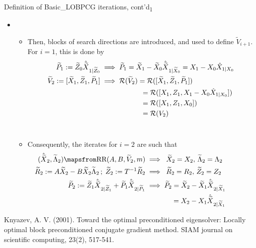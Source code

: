 \documentclass[t,usepdftitle=false]{beamer}
\begin{document}
\begin{frame}{Definition of Basic\_LOBPCG iterations, cont'd\textsubscript{1}}
	\begin{itemize}
	\item[]
	\begin{itemize}
	\item Then, blocks of search directions are introduced, and used to define $\widetilde{V}_{i+1}$.\\
	For $i=1$, this is done by\vspace{-.1cm}
	\begin{align*}
		\widetilde{P}_1:=\widetilde{Z}_0\hat{\widetilde{X}}_{1|\widetilde{Z}_0}
		&\implies\widetilde{P}_1=
		\widetilde{X}_1-\widetilde{X}_0\hat{\widetilde{X}}_{1|\widetilde{X}_0}=
		X_1-X_0\hat{X}_{1|X_0}\\
		\widetilde{V}_2:=[\widetilde{X}_1,\widetilde{Z}_1,\widetilde{P}_1]
		&\implies\mathcal{R}(\widetilde{V}_2)=\mathcal{R}([\widetilde{X}_1,\widetilde{Z}_1,\widetilde{P}_1])\\
		&\hspace{2.05cm}=\mathcal{R}([X_1,Z_1,X_1-X_0\hat{X}_{1|X_0}])\\
		&\hspace{2.05cm}=\mathcal{R}([X_1,Z_1,X_0])\\
		&\hspace{2.05cm}=\mathcal{R}(V_2)
	\end{align*}
	\vspace{-.6cm}\\
	\item Consequently, the iterates for $i=2$ are such that\vspace{-.1cm}
	\begin{align*}
	\hspace{-1.1cm}
	(\hat{\widetilde{X}}_2,\widetilde{\Lambda}_2)\mapsfrom\text{RR}(A,B,\widetilde{V}_{2},m)
	&\implies\;\widetilde{X}_2=X_2,\,\widetilde{\Lambda}_2=\Lambda_2\\
	\hspace{-1.1cm}
	\widetilde{R}_2:=A\widetilde{X}_2-B\widetilde{X}_2\widetilde{\Lambda}_2\,;\;\widetilde{Z}_2:=T^{-1}\widetilde{R}_2
	&\implies\;\widetilde{R}_2=R_2,\,\widetilde{Z}_2=Z_2\\
	\widetilde{P}_2:=\widetilde{Z}_1\hat{\widetilde{X}}_{2|\widetilde{Z}_1}+\widetilde{P}_1\hat{\widetilde{X}}_{2|\widetilde{P}_1}
	&\implies\widetilde{P}_2=
	\widetilde{X}_2-\widetilde{X}_1\hat{\widetilde{X}}_{2|\widetilde{X}_1}\\
	&\hspace{1.33cm}=X_2-X_1\hat{\widetilde{X}}_{2|\widetilde{X}_1}
	\end{align*}	
	\end{itemize}
	\end{itemize}
	\vspace*{-.1cm}
	\tiny{Knyazev, A. V. (2001). Toward the optimal preconditioned eigensolver: Locally optimal block preconditioned conjugate gradient method. SIAM journal on scientific computing, 23(2), 517-541.}
\end{frame}
\end{document}
